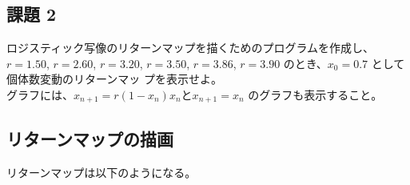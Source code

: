 \documentclass[dvipdfmx,uplatex]{jsarticle}
\begin{document}
\newpage

\subsection{課題 2}
 ロジスティック写像のリターンマップを描くためのプログラムを作成し、$r = 1.50$, $r = 2.60$, $r = 3.20$, $r = 3.50$, $r = 3.86$, $r = 3.90$ のとき、$x_{0} = 0.7$ として個体数変動のリターンマッ プを表示せよ。\\
 グラフには、$x_{n+1} = r(1 − x_{n})x_{n} と x_{n+1} = x_{n}$ のグラフも表示すること。\\

\subsection{リターンマップの描画}

リターンマップは以下のようになる。
\end{document}
